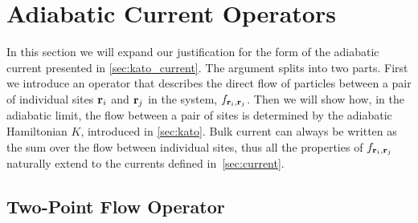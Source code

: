 \section{Adiabatic Current Operators} \label{sec:near_adiabatic}

In this section we will expand our justification for the form of the adiabatic current presented in \textsection \ref{sec:kato_current}. The argument splits into two parts. First we introduce an operator that describes the direct flow of particles between a pair of individual sites $\textbf r_i$ and $\textbf r_{j}$ in the system, $f_{\textbf r_i , \textbf r_j}$. Then we will show how, in the adiabatic limit, the flow between a pair of sites is determined by the adiabatic Hamiltonian $K$, introduced in \textsection\ref{sec:kato}. Bulk current can always be written as the sum over the flow between individual sites, thus all the properties of $f_{\textbf r_i , \textbf r_j}$ naturally extend to the currents defined in~\textsection\ref{sec:current}. 

\subsection{Two-Point Flow Operator}


